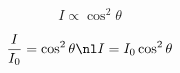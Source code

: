 \documentclass[10pt]{book}
\begin{document}
\begin{mdSnippets}
\begin{mdDisplaySnippet}[54c828d34a9ab5de03d1bd36d06f8bfe]%
\[%
I\propto\cos^2\theta
\]%
\end{mdDisplaySnippet}%
\begin{mdDisplaySnippet}[41b4da5def15fc0b54b48c1585689c1b]%
\[%
\frac{I}{I_0}=\cos^2\theta\nl
I=I_0\cos^2\theta
\]%
\end{mdDisplaySnippet}%

\end{mdSnippets}
\end{document}
